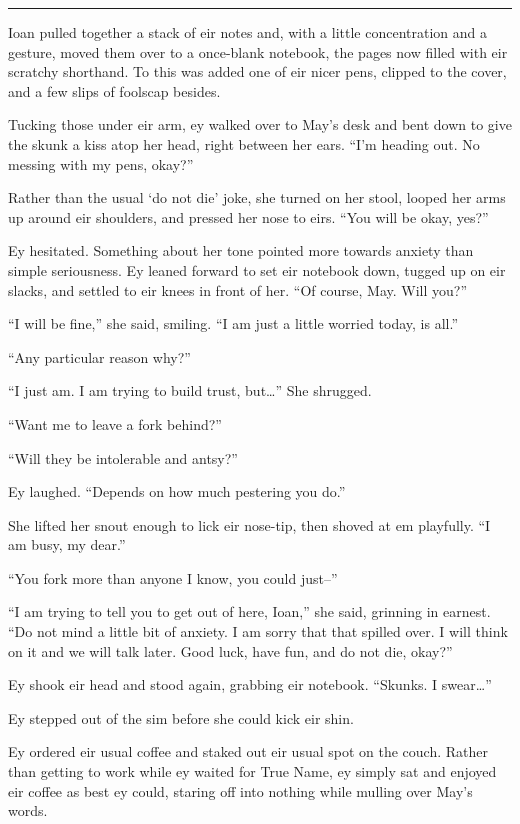 \begin{center}\rule{0.5\linewidth}{0.5pt}\end{center}

Ioan pulled together a stack of eir notes and, with a little concentration and a gesture, moved them over to a once-blank notebook, the pages now filled with eir scratchy shorthand. To this was added one of eir nicer pens, clipped to the cover, and a few slips of foolscap besides.

Tucking those under eir arm, ey walked over to May's desk and bent down to give the skunk a kiss atop her head, right between her ears. ``I'm heading out. No messing with my pens, okay?''

Rather than the usual `do not die' joke, she turned on her stool, looped her arms up around eir shoulders, and pressed her nose to eirs. ``You will be okay, yes?''

Ey hesitated. Something about her tone pointed more towards anxiety than simple seriousness. Ey leaned forward to set eir notebook down, tugged up on eir slacks, and settled to eir knees in front of her. ``Of course, May. Will you?''

``I will be fine,'' she said, smiling. ``I am just a little worried today, is all.''

``Any particular reason why?''

``I just am. I am trying to build trust, but\ldots{}'' She shrugged.

``Want me to leave a fork behind?''

``Will they be intolerable and antsy?''

Ey laughed. ``Depends on how much pestering you do.''

She lifted her snout enough to lick eir nose-tip, then shoved at em playfully. ``I am busy, my dear.''

``You fork more than anyone I know, you could just--''

``I am trying to tell you to get out of here, Ioan,'' she said, grinning in earnest. ``Do not mind a little bit of anxiety. I am sorry that that spilled over. I will think on it and we will talk later. Good luck, have fun, and do not die, okay?''

Ey shook eir head and stood again, grabbing eir notebook. ``Skunks. I swear\ldots{}''

Ey stepped out of the sim before she could kick eir shin.

Ey ordered eir usual coffee and staked out eir usual spot on the couch. Rather than getting to work while ey waited for True Name, ey simply sat and enjoyed eir coffee as best ey could, staring off into nothing while mulling over May's words.

